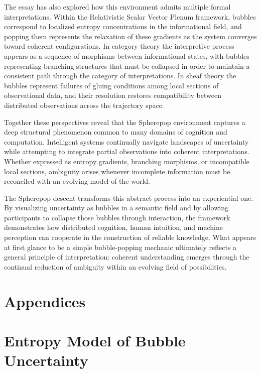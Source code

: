 \documentclass[11pt]{article}
\begin{document}
The essay has also explored how this environment admits multiple formal interpretations. Within the Relativistic Scalar Vector Plenum framework, bubbles correspond to localized entropy concentrations in the informational field, and popping them represents the relaxation of these gradients as the system converges toward coherent configurations. In category theory the interpretive process appears as a sequence of morphisms between informational states, with bubbles representing branching structures that must be collapsed in order to maintain a consistent path through the category of interpretations. In sheaf theory the bubbles represent failures of gluing conditions among local sections of observational data, and their resolution restores compatibility between distributed observations across the trajectory space.

Together these perspectives reveal that the Spherepop environment captures a deep structural phenomenon common to many domains of cognition and computation. Intelligent systems continually navigate landscapes of uncertainty while attempting to integrate partial observations into coherent interpretations. Whether expressed as entropy gradients, branching morphisms, or incompatible local sections, ambiguity arises whenever incomplete information must be reconciled with an evolving model of the world.

The Spherepop descent transforms this abstract process into an experiential one. By visualizing uncertainty as bubbles in a semantic field and by allowing participants to collapse those bubbles through interaction, the framework demonstrates how distributed cognition, human intuition, and machine perception can cooperate in the construction of reliable knowledge. What appears at first glance to be a simple bubble-popping mechanic ultimately reflects a general principle of interpretation: coherent understanding emerges through the continual reduction of ambiguity within an evolving field of possibilities.

\newpage
\section*{Appendices}

\appendix


\section{Entropy Model of Bubble Uncertainty}
\end{document}
